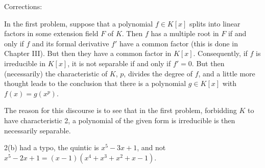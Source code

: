 \documentclass[12pt]{article}
\begin{document}
{\color{red}Corrections: }

In  the first problem, suppose that a polynomial $f\in K[x]$ splits into linear factors in some extension field $F$ of $K$.
Then $f$ has a multiple root in $F$ if and only if $f$ and its formal derivative $f'$ have a common factor (this is done in Chapter III).
But then they have a common factor in $K[x]$.
Consequently, if $f$ is irreducible in $K[x]$, it is not separable if and only if $f'=0$.
But then (necessarily) the characteristic of $K$, $p$, divides the degree of $f$, and a little more thought leads to the conclusion that
there is a polynomial $g\in K[x]$ with $f(x)=g(x^p)$.

The reason for this discourse is to see that in the first problem, forbidding $K$ to have characteristic 2, a polynomial of the given form
is irreducible is then necessarily separable.\bigskip

2(b)  had a typo, the quintic is $x^5-3x+1$, and not $x^5-2x+1=(x-1)(x^4+x^3+x^2+x-1)$.
\end{document}
